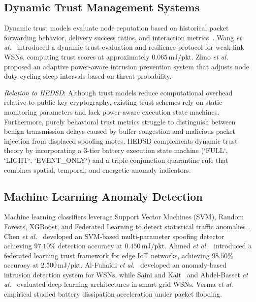 \documentclass[conference]{IEEEtran}
\begin{document}
\subsection{Dynamic Trust Management Systems}
Dynamic trust models evaluate node reputation based on historical packet forwarding behavior, delivery success ratios, and interaction metrics~\cite{ref_trust_wsn_25, ref_rfsn_26, ref_trust_sybil_28}. Wang \textit{et al.}~\cite{ref_tmc_trust_2024} introduced a dynamic trust evaluation and resilience protocol for weak-link WSNs, computing trust scores at approximately $0.065\,\text{mJ/pkt}$. Zhao \textit{et al.}~\cite{ref_zhao_tdsc_2025} proposed an adaptive power-aware intrusion prevention system that adjusts node duty-cycling sleep intervals based on threat probability.

\textit{Relation to HEDSD}: Although trust models reduce computational overhead relative to public-key cryptography, existing trust schemes rely on static monitoring parameters and lack power-aware execution state machines. Furthermore, purely behavioral trust metrics struggle to distinguish between benign transmission delays caused by buffer congestion and malicious packet injection from displaced spoofing motes. HEDSD complements dynamic trust theory by incorporating a 3-tier battery execution state machine (`FULL`, `LIGHT`, `EVENT\_ONLY`) and a triple-conjunction quarantine rule that combines spatial, temporal, and energetic anomaly indicators.

\subsection{Machine Learning Anomaly Detection}
Machine learning classifiers leverage Support Vector Machines (SVM), Random Forests, XGBoost, and Federated Learning to detect statistical traffic anomalies~\cite{ref_ml_ids_17, ref_rf_wsn_31, ref_xgb_ids_32}. Chen \textit{et al.}~\cite{ref_jsen_svm_2022} developed an SVM-based multi-parameter spoofing detector achieving $97.10\%$ detection accuracy at $0.450\,\text{mJ/pkt}$. Ahmed \textit{et al.}~\cite{ref_iotj_fedtrust_2024} introduced a federated learning trust framework for edge IoT networks, achieving $98.50\%$ accuracy at $2.500\,\text{mJ/pkt}$. Al-Fuhaidi \textit{et al.}~\cite{ref_wiley_ids_2024} developed an anomaly-based intrusion detection system for WSNs, while Saini and Kait~\cite{ref_saini_i2ct_2024} and Abdel-Basset \textit{et al.}~\cite{ref_abdelbasset_tnsm_2024} evaluated deep learning architectures in smart grid WSNs. Verma \textit{et al.}~\cite{ref_verma_tosn_2024} empirical studied battery dissipation acceleration under packet flooding.
\end{document}
